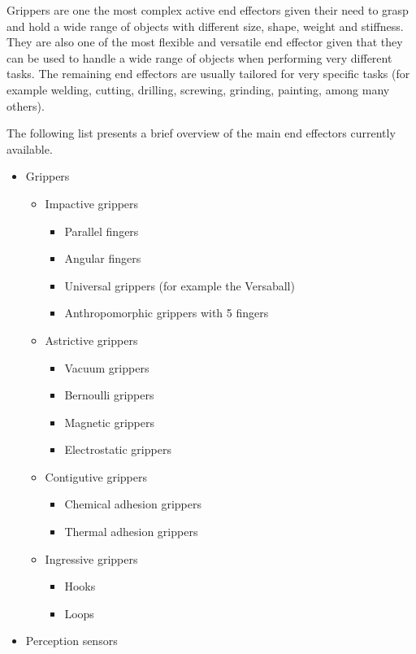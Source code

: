 Grippers are one the most complex active end effectors given their need to grasp \cite{Sahbani2012} and hold a wide range of objects with different size, shape, weight and stiffness. They are also one of the most flexible and versatile end effector given that they can be used to handle a wide range of objects when performing very different tasks. The remaining end effectors are usually tailored for very specific tasks (for example welding, cutting, drilling, screwing, grinding, painting, among many others).

The following list presents a brief overview of the main end effectors currently available.

\begin{itemize}
	\item Grippers
	\begin{itemize}
		\item Impactive grippers
		\begin{itemize}
			\item Parallel fingers
			\item Angular fingers
			\item Universal grippers (for example the Versaball)
			\item Anthropomorphic grippers with 5 fingers
		\end{itemize}
		\item Astrictive grippers
		\begin{itemize}
			\item Vacuum grippers
			\item Bernoulli grippers
			\item Magnetic grippers
			\item Electrostatic grippers
		\end{itemize}
		\item Contigutive grippers
		\begin{itemize}
			\item Chemical adhesion grippers
			\item Thermal adhesion grippers
		\end{itemize}
		\item Ingressive grippers
		\begin{itemize}
			\item Hooks
			\item Loops
		\end{itemize}
	\end{itemize}
	\item Perception sensors
	\begin{itemize}

\end{itemize}
\end{itemize}
